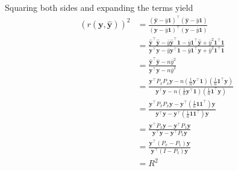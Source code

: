 \documentclass[12pt]{article}
\newcommand{\m}[1]{\mathbf{\bm{#1}}}
\begin{document}
Squaring both sides and expanding the terms yield
\begin{align*}
(r(\m{y},\hat{\m{y}}))^2 &= \frac{(\hat{\m{y}}-\bar{y}\m{1})^\top(\hat{\m{y}}-\bar{y}\m{1})}{(\m{y}-\bar{y}\m{1})^\top(\m{y}-\bar{y}\m{1})} \\
&= \frac{\hat{\m{y}}^\top\hat{\m{y}} -\bar{y}\hat{\m{y}}^\top\m{1}-\bar{y}\m{1}^\top\hat{\m{y}}+\bar{y}^2\m{1}^\top\m{1}}{\m{y}^\top\m{y} -\bar{y}\m{y}^\top\m{1}-\bar{y}\m{1}^\top\m{y}+\bar{y}^2\m{1}^\top\m{1}} \\
&= \frac{\hat{\m{y}}^\top\hat{\m{y}} -n\bar{y}^2}{\m{y}^\top\m{y} -n\bar{y}^2} \\
&= \frac{\m{y}^\top P_xP_x\m{y} - n(\frac{1}{n}\m{y}^\top\m{1})(\frac{1}{n}\m{1}^\top\m{y})}{\m{y}^\top\m{y} - n(\frac{1}{n}\m{y}^\top\m{1})(\frac{1}{n}\m{1}^\top\m{y})} \\
&= \frac{\m{y}^\top P_xP_x\m{y} - \m{y}^\top(\frac{1}{n}\m{1}\m{1}^\top)\m{y}}{\m{y}^\top\m{y} - \m{y}^\top(\frac{1}{n}\m{1}\m{1}^\top)\m{y}} \\
&= \frac{\m{y}^\top P_x\m{y} - \m{y}^\top P_1\m{y}}{\m{y}^\top\m{y} - \m{y}^\top P_1\m{y}} \\
&= \frac{\m{y}^\top (P_x - P_1)\m{y}}{\m{y}^\top(I-P_1)\m{y}} \\
&= R^2
\end{align*}
\end{document}
